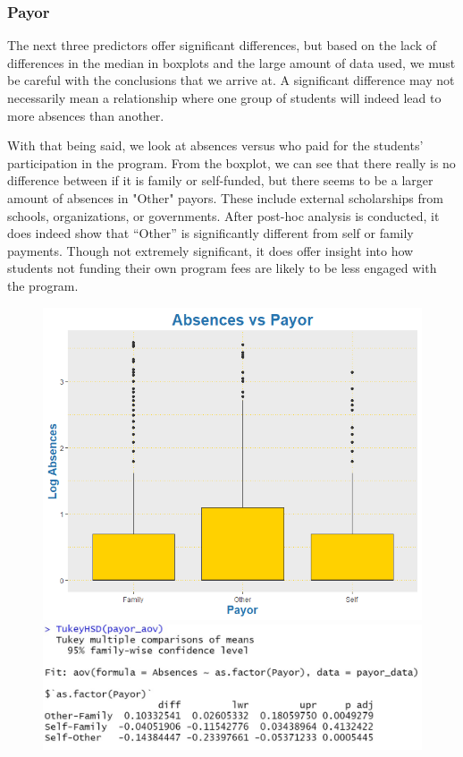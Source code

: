 \documentclass[12pt,letterpaper]{article}
\begin{document}
\subsubsection{Payor}

The next three predictors offer significant differences, but based on the lack of differences in the median in boxplots and the large amount of data used, we must be careful with the conclusions that we arrive at. A significant difference may not necessarily mean a relationship where one group of students will indeed lead to more absences than another.

With that being said, we look at absences versus who paid for the students’ participation in the program. From the boxplot, we can see that there really is no difference between if it is family or self-funded, but there seems to be a larger amount of absences in "Other" payors. These include external scholarships from schools, organizations, or governments. After post-hoc analysis is conducted, it does indeed show that “Other” is significantly different from self or family payments. Though not extremely significant, it does offer insight into how students not funding their own program fees are likely to be less engaged with the program.

\begin{figure}[!ht]
  \centering
  \begin{minipage}[b]{0.49\textwidth}
    \includegraphics[width=\textwidth]{Plots/4. Payor.png}
  \end{minipage}
  \hfill
  \begin{minipage}[b]{0.49\textwidth}
    \includegraphics[width=\textwidth]{Plots/4. Payor Tukey.jpg}
  \end{minipage}
\end{figure}
\end{document}
